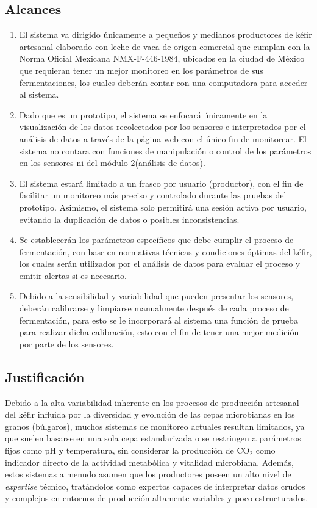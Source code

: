 \subsection{Alcances}
\begin{enumerate}
    \item El sistema va dirigido únicamente a pequeños y medianos productores de
        kéfir artesanal elaborado con leche de vaca de origen comercial que cumplan
        con la Norma Oficial Mexicana NMX-F-446-1984, ubicados en la ciudad de
        México que requieran tener un mejor monitoreo en los parámetros de sus
        fermentaciones, los cuales deberán contar con una computadora para
        acceder al sistema.
    \item Dado que es un prototipo, el sistema se enfocará únicamente en la
        visualización de los datos recolectados por los sensores e interpretados por
        el análisis de datos a través de la página web con el único fin de monitorear.
        El sistema no contara con funciones de manipulación o control de los
        parámetros en los sensores ni del módulo 2(análisis de datos).
    \item El sistema estará limitado a un frasco por usuario (productor), con el fin de
        facilitar un monitoreo más preciso y controlado durante las pruebas del
        prototipo. Asimismo, el sistema solo permitirá una sesión activa por usuario,
        evitando la duplicación de datos o posibles inconsistencias.
    \item Se establecerán los parámetros específicos que debe cumplir el proceso de
        fermentación, con base en normativas técnicas y condiciones óptimas del
        kéfir, los cuales serán utilizados por el análisis de datos para evaluar el
        proceso y emitir alertas si es necesario.
    \item Debido a la sensibilidad y variabilidad que pueden presentar los sensores,
        deberán calibrarse y limpiarse manualmente después de cada proceso de
        fermentación, para esto se le incorporará al sistema una función de prueba
        para realizar dicha calibración, esto con el fin de tener una mejor medición
        por parte de los sensores.
\end{enumerate}

\subsection{Justificación}

Debido a la alta variabilidad inherente en los procesos de producción artesanal 
del kéfir influida por la diversidad y evolución de las cepas microbianas en los granos 
(búlgaros), muchos sistemas de monitoreo actuales resultan limitados, ya que suelen basarse en 
una sola cepa estandarizada o se restringen a parámetros fijos como pH y temperatura, 
sin considerar la producción de CO$_2$ como indicador directo de la actividad metabólica y 
vitalidad microbiana. Además, estos sistemas a menudo asumen que los productores poseen un alto 
nivel de \textit{expertise} técnico, tratándolos como expertos capaces de interpretar datos crudos 
y complejos en entornos de producción altamente variables y poco estructurados.

